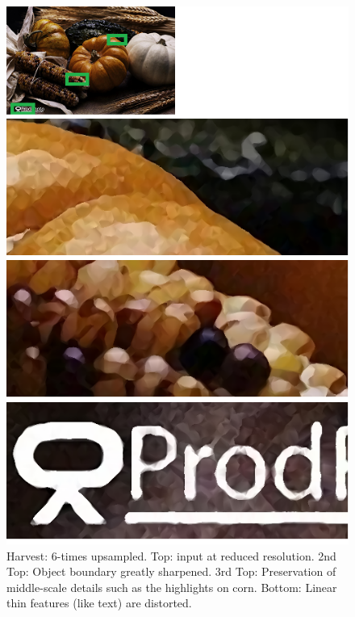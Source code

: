 \begin{figure}[htbp]\centering
\includegraphics{imagesPM/f6.png}
\caption{Harvest: 6-times upsampled. Top: input at reduced resolution. 2nd Top: Object boundary greatly sharpened. 3rd Top: Preservation of middle-scale details such as the highlights on corn. Bottom: Linear thin features (like text) are distorted.}
\label{fig:genHarvest}
\end{figure}

